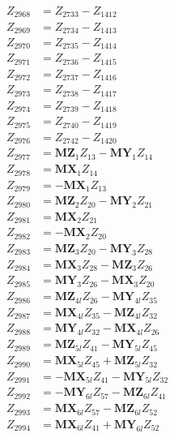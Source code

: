 \begin{multicols}{2}
\begin{align}
Z_{2968} &= Z_{2733} - Z_{1412} \nonumber \\
Z_{2969} &= Z_{2734} - Z_{1413} \nonumber \\
Z_{2970} &= Z_{2735} - Z_{1414} \nonumber \\
Z_{2971} &= Z_{2736} - Z_{1415} \nonumber \\
Z_{2972} &= Z_{2737} - Z_{1416} \nonumber \\
Z_{2973} &= Z_{2738} - Z_{1417} \nonumber \\
Z_{2974} &= Z_{2739} - Z_{1418} \nonumber \\
Z_{2975} &= Z_{2740} - Z_{1419} \nonumber \\
Z_{2976} &= Z_{2742} - Z_{1420} \nonumber \\
Z_{2977} &= \mathbf{MZ}_1Z_{13} - \mathbf{MY}_1Z_{14} \nonumber \\
Z_{2978} &= \mathbf{MX}_1Z_{14} \nonumber \\
Z_{2979} &= -\mathbf{MX}_1Z_{13} \nonumber \\
Z_{2980} &= \mathbf{MZ}_2Z_{20} - \mathbf{MY}_2Z_{21} \nonumber \\
Z_{2981} &= \mathbf{MX}_2Z_{21} \nonumber \\
Z_{2982} &= -\mathbf{MX}_2Z_{20} \nonumber \\
Z_{2983} &= \mathbf{MZ}_3Z_{20} - \mathbf{MY}_3Z_{28} \nonumber \\
Z_{2984} &= \mathbf{MX}_3Z_{28} - \mathbf{MZ}_3Z_{26} \nonumber \\
Z_{2985} &= \mathbf{MY}_3Z_{26} - \mathbf{MX}_3Z_{20} \nonumber \\
Z_{2986} &= \mathbf{MZ}_{4l}Z_{26} - \mathbf{MY}_{4l}Z_{35} \nonumber \\
Z_{2987} &= \mathbf{MX}_{4l}Z_{35} - \mathbf{MZ}_{4l}Z_{32} \nonumber \\
Z_{2988} &= \mathbf{MY}_{4l}Z_{32} - \mathbf{MX}_{4l}Z_{26} \nonumber \\
Z_{2989} &= \mathbf{MZ}_{5l}Z_{41} - \mathbf{MY}_{5l}Z_{45} \nonumber \\
Z_{2990} &= \mathbf{MX}_{5l}Z_{45} + \mathbf{MZ}_{5l}Z_{32} \nonumber \\
Z_{2991} &= - \mathbf{MX}_{5l}Z_{41} - \mathbf{MY}_{5l}Z_{32} \nonumber \\
Z_{2992} &= - \mathbf{MY}_{6l}Z_{57} - \mathbf{MZ}_{6l}Z_{41} \nonumber \\
Z_{2993} &= \mathbf{MX}_{6l}Z_{57} - \mathbf{MZ}_{6l}Z_{52} \nonumber \\
Z_{2994} &= \mathbf{MX}_{6l}Z_{41} + \mathbf{MY}_{6l}Z_{52} \nonumber \\

\end{align}
\end{multicols}
